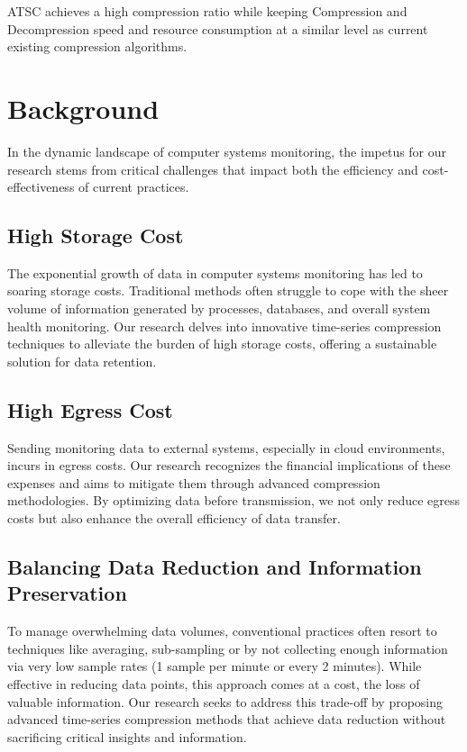 \documentclass[conference]{IEEEtran}
\begin{document}
ATSC achieves a high compression ratio while keeping Compression and Decompression speed and resource consumption at a similar level as current existing compression algorithms.

\section{Background}

In the dynamic landscape of computer systems monitoring, the impetus for our research stems from critical challenges that impact both the efficiency and cost-effectiveness of current practices. 

\subsection{High Storage Cost}

The exponential growth of data in computer systems monitoring has led to soaring storage costs. Traditional methods often struggle to cope with the sheer volume of information generated by processes, databases, and overall system health monitoring. Our research delves into innovative time-series compression techniques to alleviate the burden of high storage costs, offering a sustainable solution for data retention. 

\subsection{High Egress Cost}
Sending monitoring data to external systems, especially in cloud environments, incurs in egress costs. Our research recognizes the financial implications of these expenses and aims to mitigate them through advanced compression methodologies. By optimizing data before transmission, we not only reduce egress costs but also enhance the overall efficiency of data transfer. 

\subsection{Balancing Data Reduction and Information Preservation}
To manage overwhelming data volumes, conventional practices often resort to techniques like averaging, sub-sampling or by not collecting enough information via very low sample rates (1 sample per minute or every 2 minutes). While effective in reducing data points, this approach comes at a cost, the loss of valuable information. Our research seeks to address this trade-off by proposing advanced time-series compression methods that achieve data reduction without sacrificing critical insights and information. 
\end{document}
